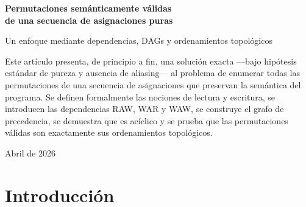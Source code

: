 \documentclass[letterpaper,oneside]{article}
\theoremstyle{remark}
\begin{document}
\begin{titlepage}
  \centering
  \vspace*{3.0cm}
  {\huge\bfseries Permutaciones semánticamente válidas\\[0.25em] de una secuencia de asignaciones puras\par}
  \vspace{1.0cm}
  {\large Un enfoque mediante dependencias, DAGs y ordenamientos topológicos\par}
  \vspace{1.8cm}
  \begin{minipage}{0.86\textwidth}
  \colorbox{lightaccent}{\parbox{0.94\textwidth}{\vspace{0.5em}
  Este artículo presenta, de principio a fin, una solución exacta ---bajo hipótesis estándar de pureza y ausencia de aliasing--- al problema de enumerar todas las permutaciones de una secuencia de asignaciones que preservan la semántica del programa. Se definen formalmente las nociones de lectura y escritura, se introducen las dependencias RAW, WAR y WAW, se construye el grafo de precedencia, se demuestra que es acíclico y se prueba que las permutaciones válidas son exactamente sus ordenamientos topológicos.\vspace{0.5em}}}
  \end{minipage}
  \vfill
  {\large Abril de 2026\par}
\end{titlepage}

\begin{abstract}
Dada una secuencia lineal de asignaciones de la forma $x := e$, donde los lados derechos son puros, deterministas y sin efectos laterales, estudiamos el problema de caracterizar todas las permutaciones que preservan la semántica del programa. Mostramos que el problema se reduce a extraer un conjunto de restricciones de precedencia a partir de los conjuntos de variables leídas y escritas por cada instrucción. Dichas restricciones inducen un grafo dirigido acíclico; las secuencias semánticamente válidas son exactamente los ordenamientos topológicos de ese grafo. El desarrollo es autocontenido: fija el modelo semántico, presenta los algoritmos, incluye pruebas de corrección y recorre ejemplos completos.
\end{abstract}

\section{Introducción}
\end{document}
